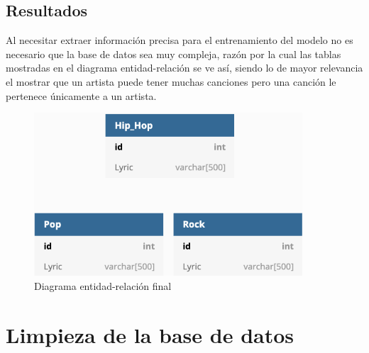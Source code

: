 \documentclass[12pt, a4paper, titlepage]{report}
\begin{document}
		\subsection{Resultados}
		Al necesitar extraer información precisa para el entrenamiento del modelo no es necesario que la base de datos sea muy compleja, razón por la cual las tablas mostradas en el diagrama entidad-relación se ve así, siendo lo de mayor relevancia el mostrar que un artista puede tener muchas canciones pero una canción le pertenece únicamente a un artista.
		\begin{figure}[H]
			\includegraphics[width=10cm]{./imagenes/Disenio/Iteracion_1/Base_de_Datos/Hip_Hop.png}
			\centering 
			\caption{Diagrama entidad-relación final}
		\end{figure}
		
		
\newpage

	
\section{Limpieza de la base de datos} %
\end{document}
